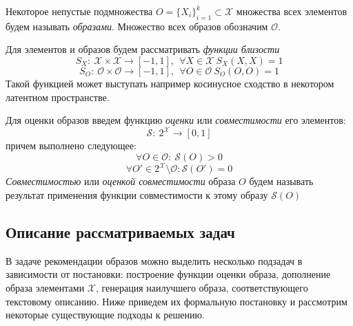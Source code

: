\documentclass[a4paper,14pt]{extarticle}
\begin{document}
			Некоторое непустые подмножества $O = \{X_i\}_{i=1}^k\subset \mathcal{X}$ множества всех элементов будем называть \textit{образами}.
			Множество всех образов обозначим $\mathcal{O}$.
		    
			Для элементов и образов будем рассматривать \textit{функции близости}
				$$S_X:~\mathcal{X}\times \mathcal{X}\longrightarrow [-1,1], ~~\forall X\in\mathcal{X}~S_X(X,X) = 1$$
				$$S_O:~\mathcal{O}\times \mathcal{O}\longrightarrow [-1,1], ~~\forall O\in\mathcal{O}~S_O(O,O) = 1$$
			Такой функцией может выступать например косинусное сходство в некотором латентном пространстве.
				
			Для оценки образов введем функцию \textit{оценки} или \textit{совместимости} его элементов: 
			$$\mathcal{S}:~2^\mathcal{X}\longrightarrow [0,1]$$
			 причем выполнено следующее:
			$$\forall O \in \mathcal{O}:~\mathcal{S}(O) > 0$$
			$$\forall O' \in 2^\mathcal{X} \setminus \mathcal{O}: \mathcal{S}(O') =0$$
			\textit{Совместимостью} или \textit{оценкой совместимости} образа $O$ будем называть результат применения функции совместимости к этому образу $\mathcal{S}(O)$
			
		\subsection{Описание рассматриваемых задач}
			В задаче рекомендации образов можно выделить несколько подзадач в зависимости от постановки: построение функции оценки образа, 
			дополнение образа элементами $\mathcal{X}$, генерация наилучшего образа, соответствующего текстовому описанию. Ниже приведем их формальную постановку и рассмотрим некоторые существующие подходы к решению.
\end{document}
